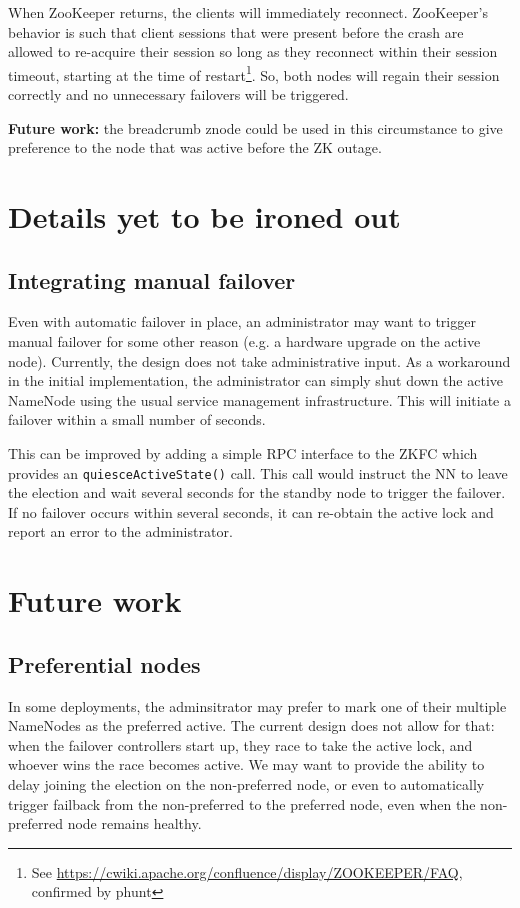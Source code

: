 \documentclass{article}
\begin{document}
When ZooKeeper returns, the clients will immediately reconnect. ZooKeeper's behavior is such that client sessions that were present before the crash are allowed to re-acquire their session so long as they reconnect within their session timeout, starting at the time of restart\footnote{See \url{https://cwiki.apache.org/confluence/display/ZOOKEEPER/FAQ}, confirmed by phunt}. So, both nodes will regain their session correctly and no unnecessary failovers will be triggered.

{\bf Future work:} the breadcrumb znode could be used in this circumstance to give preference to the node that was active before the ZK outage.

\section{Details yet to be ironed out}

\subsection{Integrating manual failover}
Even with automatic failover in place, an administrator may want to trigger manual failover for some other reason (e.g. a hardware upgrade on the active node). Currently, the design does not take administrative input. As a workaround in the initial implementation, the administrator can simply shut down the active NameNode using the usual service management infrastructure. This will initiate a failover within a small number of seconds.

This can be improved by adding a simple RPC interface to the ZKFC which provides an {\tt quiesceActiveState()} call. This call would instruct the NN to leave the election and wait several seconds for the standby node to trigger the failover. If no failover occurs within several seconds, it can re-obtain the active lock and report an error to the administrator.

\section{Future work}

\subsection{Preferential nodes}
In some deployments, the adminsitrator may prefer to mark one of their multiple NameNodes as the preferred active. The current design does not allow for that: when the failover controllers start up, they race to take the active lock, and whoever wins the race becomes active. We may want to provide the ability to delay joining the election on the non-preferred node, or even to automatically trigger failback from the non-preferred to the preferred node, even when the non-preferred node remains healthy.
\end{document}
